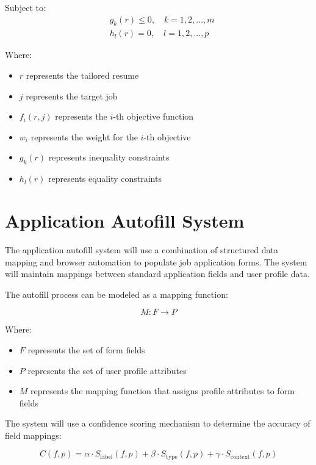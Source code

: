\documentclass[12pt,a4paper]{report}
\begin{document}
Subject to:
\begin{align}
    & g_k(r) \leq 0, \quad k = 1, 2, ..., m \\
    & h_l(r) = 0, \quad l = 1, 2, ..., p
\end{align}

Where:
\begin{itemize}
    \item $r$ represents the tailored resume
    \item $j$ represents the target job
    \item $f_i(r, j)$ represents the $i$-th objective function
    \item $w_i$ represents the weight for the $i$-th objective
    \item $g_k(r)$ represents inequality constraints
    \item $h_l(r)$ represents equality constraints
\end{itemize}

\section*{Application Autofill System}

The application autofill system will use a combination of structured data mapping and browser automation to populate job application forms. The system will maintain mappings between standard application fields and user profile data.

The autofill process can be modeled as a mapping function:

\begin{equation}
    M: F \rightarrow P
\end{equation}

Where:
\begin{itemize}
    \item $F$ represents the set of form fields
    \item $P$ represents the set of user profile attributes
    \item $M$ represents the mapping function that assigns profile attributes to form fields
\end{itemize}

The system will use a confidence scoring mechanism to determine the accuracy of field mappings:

\begin{equation}
    C(f, p) = \alpha \cdot S_{\text{label}}(f, p) + \beta \cdot S_{\text{type}}(f, p) + \gamma \cdot S_{\text{context}}(f, p)
\end{equation}
\end{document}

